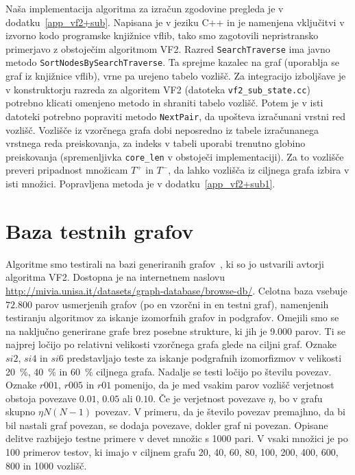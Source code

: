 \documentclass[a4paper, 12pt, ]{book}
\begin{document}
	Naša implementacija algoritma za izračun zgodovine pregleda je v dodatku~\ref{app_vf2+sub}. Napisana je v jeziku C++ in je namenjena vključitvi v
	izvorno kodo programske knjižnice vflib, tako smo zagotovili nepristransko primerjavo z obstoječim algoritmom VF2. Razred \texttt{SearchTraverse} ima
	javno metodo \texttt{Sort\-Nodes\-By\-Search\-Traverse}. Ta sprejme
	kazalec na graf (uporablja se graf iz knjižnice vflib), vrne pa urejeno tabelo vozlišč. Za integracijo izboljšave je v konstruktorju razreda za algoritem VF2
	(datoteka \texttt{vf2\_sub\_state.cc}) potrebno klicati omenjeno metodo in shraniti tabelo vozlišč. Potem je v isti datoteki potrebno popraviti metodo
	\texttt{NextPair}, da upošteva izračunani vrstni red vozlišč. Vozlišče iz vzorčnega grafa dobi neposredno iz tabele izračunanega vrstnega reda 
	preiskovanja, za indeks v tabeli uporabi trenutno globino preiskovanja (spremenljivka \texttt{core\_len} v obstoječi implementaciji). Za to vozlišče preveri
	pripadnost množicam $T^+$ in $T^-$, da lahko vozlišča iz ciljnega grafa izbira v isti množici. Popravljena metoda je v dodatku~\ref{app_vf2+sub1}.
	
	
	\section{Baza testnih grafov}
	Algoritme smo testirali na bazi generiranih grafov~\cite{database}, ki so jo ustvarili avtorji algoritma VF2. Dostopna je na internetnem naslovu
	\href{http://mivia.unisa.it/datasets/graph-database/browse-db/}
	{http://mivia.unisa.it/{\allowbreak}datasets/{\allowbreak}graph-database/browse-db/}. Celotna baza vsebuje 	
	$72.800$ parov usmerjenih grafov (po en vzorčni in
	en testni graf), namenjenih testiranju algoritmov za iskanje izomorfnih grafov in podgrafov. Omejili smo se na naključno generirane grafe brez posebne
	strukture, ki jih je 9.000 parov. Ti se najprej ločijo po relativni velikosti vzorčnega grafa glede na ciljni graf. Oznake $si2$, $si4$ in $si6$ predstavljajo
	teste za iskanje podgrafnih izomorfizmov v velikosti 20~\!\%, 40~\!\% in 60~\!\% ciljnega grafa. Nadalje se testi ločijo po številu povezav. Oznake
	$r001$,
	$r005$ in $r01$ pomenijo, da je med vsakim parov vozlišč verjetnost obstoja povezave $0.01$, $0.05$ ali $0.10$. Če je verjetnost povezave $\eta$,
	bo v grafu skupno $\eta N (N-1)$ povezav. V primeru, da je število povezav premajhno, da bi bil nastali graf povezan, se dodaja povezave, dokler graf ni 
	povezan. Opisane delitve razbijejo testne primere v devet množic s 1000 pari. V vsaki množici je po 100 primerov testov, ki imajo v ciljnem grafu 20, 40,
	60, 80, 100, 200, 400, 600, 800 in 1000 vozlišč.
\end{document}
